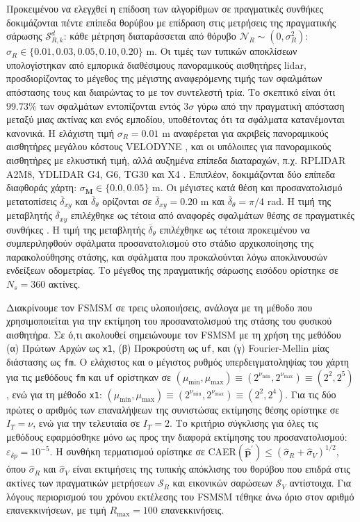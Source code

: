 Προκειμένου να ελεγχθεί η επίδοση των αλγορίθμων σε πραγματικές συνθήκες
δοκιμάζονται πέντε επίπεδα θορύβου με επίδραση στις μετρήσεις της πραγματικής
σάρωσης $\mathcal{S}_{R,k}^d$: κάθε μέτρηση διαταράσσεται από θόρυβο
$\mathcal{N}_{R} \sim (0, \sigma_{R}^2)$: $\sigma_R \in \{0.01, 0.03, 0.05,
0.10, 0.20\}$ m. Οι τιμές των τυπικών αποκλίσεων υπολογίστηκαν από εμπορικά
διαθέσιμους πανοραμικούς αισθητήρες lidar, προσδιορίζοντας το μέγεθος της
μέγιστης αναφερόμενης τιμής των σφαλμάτων απόστασης τους και διαιρώντας το με
τον συντελεστή τρία. Το σκεπτικό είναι ότι $99.73\%$ των σφαλμάτων εντοπίζονται
εντός $3\sigma$ γύρω από την πραγματική απόσταση μεταξύ μιας ακτίνας και ενός
εμποδίου, υποθέτοντας ότι τα σφάλματα κατανέμονται κανονικά. Η ελάχιστη τιμή
$\sigma_R = 0.01$ m αναφέρεται για ακριβείς πανοραμικούς αισθητήρες μεγάλου
κόστους VELODYNE \cite{velodyne_datasheet}, και οι υπόλοιπες για πανοραμικούς
αισθητήρες με ελκυστική τιμή, αλλά αυξημένα επίπεδα διαταραχών, π.χ. RPLIDAR
A2M8, YDLIDAR G4, G6, TG30 και X4 \cite{a2m8_datasheet,ydlidar}. Επιπλέον,
δοκιμάζονται δύο επίπεδα διαφθοράς χάρτη: $\sigma_{\bm{M}} \in \{0.0, 0.05\}$
m.  Οι μέγιστες κατά θέση και προσανατολισμό μετατοπίσεις
$\overline{\delta}_{xy}$ και $\overline{\delta}_{\theta}$ ορίζονται σε
$\overline{\delta}_{xy} = 0.20$ m και $\overline{\delta}_\theta = \pi / 4$ rad.
Η τιμή της μεταβλητής $\overline{\delta}_{xy}$ επιλέχθηκε ως τέτοια από
αναφορές σφαλμάτων θέσης σε πραγματικές συνθήκες \cite{Peng2018a}. Η τιμή της
μεταβλητής $\overline{\delta}_\theta$ επιλέχθηκε ως τέτοια προκειμένου να
συμπεριληφθούν σφάλματα προσανατολισμού στο στάδιο αρχικοποίησης της
παρακολούθησης στάσης, και σφάλματα που προκαλούνται λόγω αποκλινουσών
ενδείξεων οδομετρίας. Το μέγεθος της πραγματικής σάρωσης εισόδου ορίστηκε σε
$N_s=360$ ακτίνες.

Διακρίνουμε τον FSMSM σε τρεις υλοποιήσεις, ανάλογα με τη μέθοδο που
χρησιμοποιείται για την εκτίμηση του προσανατολισμού της στάσης του φυσικού
αισθητήρα. Σε ό,τι ακολουθεί σημειώνουμε τον FSMSM με τη χρήση της μεθόδου (α)
Πρώτων Αρχών ως \texttt{x1}, (β) Προκρούστη ως \texttt{uf}, και (γ)
Fourier-Mellin μίας διάστασης ως \texttt{fm}. Ο ελάχιστος και ο μέγιστος ρυθμός
υπερδειγματοληψίας του χάρτη για τις μεθόδους \texttt{fm} και \texttt{uf}
ορίστηκαν σε $(\mu_{\min},\mu_{\max}) \equiv (2^{\nu_{\min}},2^{\nu_{\max}})
\equiv (2^2,2^5)$, ενώ για τη μέθοδο \texttt{x1}: $(\mu_{\min},\mu_{\max})
\equiv (2^{\nu_{\min}},2^{\nu_{\max}}) \equiv (2^2,2^4)$. Για τις δύο πρώτες ο
αριθμός των επαναλήψεων της συνιστώσας εκτίμησης θέσης ορίστηκε σε $I_T=\nu$,
ενώ για την τελευταία σε $I_T = 2$.  Το κριτήριο σύγκλισης για όλες τις
μεθόδους εφαρμόσθηκε μόνο ως προς την διαφορά εκτίμησης του προσανατολισμού:
$\varepsilon_{\delta p} = 10^{-5}$.  Η συνθήκη τερματισμού ορίστηκε σε
CAER$(\hat{\bm{p}}^\prime) \leq (\hat{\sigma}_R + \hat{\sigma}_V)^{1/2}$, όπου
$\hat{\sigma}_R$ και $\hat{\sigma}_V$ είναι εκτιμήσεις της τυπικής απόκλισης
του θορύβου που επιδρά στις ακτίνες των πραγματικών μετρήσεων $\mathcal{S}_R$
και εικονικών σαρώσεων $\mathcal{S}_V$ αντίστοιχα. Για λόγους περιορισμού του
χρόνου εκτέλεσης του FSMSM τέθηκε άνω όριο στον αριθμό επανεκκινήσεων, με τιμή
$R_{\max} = 100$ επανεκκινήσεις.

